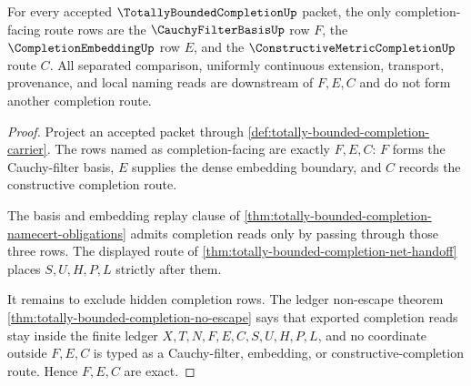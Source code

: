 \begin{theorem}
\label{thm:totally-bounded-completion-completion-route-exactness}
For every accepted $\TotallyBoundedCompletionUp$ packet, the only completion-facing route rows are the $\CauchyFilterBasisUp$ row $F$, the $\CompletionEmbeddingUp$ row $E$, and the $\ConstructiveMetricCompletionUp$ route $C$. All separated comparison, uniformly continuous extension, transport, provenance, and local naming reads are downstream of $F,E,C$ and do not form another completion route.
\end{theorem}
\begin{proof}
Project an accepted packet through \autoref{def:totally-bounded-completion-carrier}. The rows named as completion-facing are exactly $F,E,C$: $F$ forms the Cauchy-filter basis, $E$ supplies the dense embedding boundary, and $C$ records the constructive completion route.

The basis and embedding replay clause of \autoref{thm:totally-bounded-completion-namecert-obligations} admits completion reads only by passing through those three rows. The displayed route of \autoref{thm:totally-bounded-completion-net-handoff} places $S,U,H,P,L$ strictly after them.

It remains to exclude hidden completion rows. The ledger non-escape theorem \autoref{thm:totally-bounded-completion-no-escape} says that exported completion reads stay inside the finite ledger $X,T,N,F,E,C,S,U,H,P,L$, and no coordinate outside $F,E,C$ is typed as a Cauchy-filter, embedding, or constructive-completion route. Hence $F,E,C$ are exact.
\end{proof}

